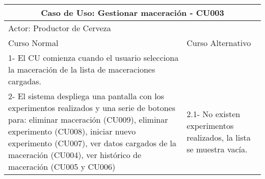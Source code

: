    \begin{table}[H]
    \begin{center}
    \begin{tabularx}{\textwidth}{ | X | X |}
        \hline
        \multicolumn{2}{|c|}{\textbf{Caso de Uso: Gestionar maceración - CU003}} \\
        \hline
        \multicolumn{2}{|l|}{Actor: Productor de Cerveza} \\
        \hline
        Curso Normal & Curso Alternativo \\
        \hline
        1- El CU comienza cuando el usuario selecciona la maceración de la lista de maceraciones cargadas. & \\
        \hline
        2- El sistema despliega una pantalla con los experimentos realizados y una serie de botones para: eliminar maceración (CU009), eliminar experimento (CU008), iniciar nuevo experimento (CU007), ver datos cargados de la maceración (CU004), ver histórico de maceración (CU005 y CU006) & 2.1- No existen experimentos realizados, la lista se muestra vacía.
        \\
        \hline
    \end{tabularx}
    \label{CU003a}
    \end{center}
    \end{table}
    
%        

